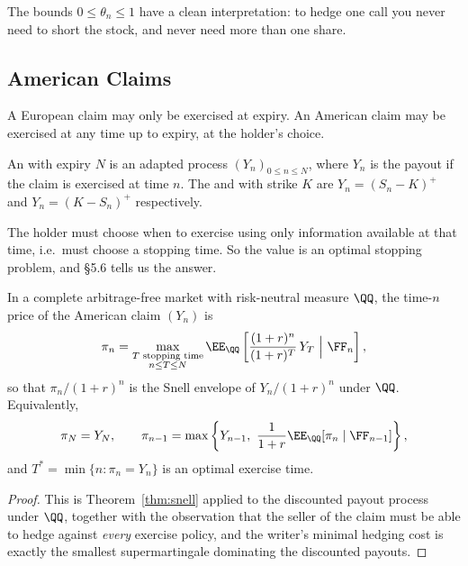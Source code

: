 The bounds $0 \leq \theta_n \leq 1$ have a clean interpretation: to hedge one call you never need to short the stock, and never need more than one share.

\subsection{American Claims}

A European claim may only be exercised at expiry. An American claim may be exercised at any time up to expiry, at the holder's choice.

\begin{definition}
	An  with expiry $N$ is an adapted process $(Y_n)_{0\leq n\leq N}$, where $Y_n$ is the payout if the claim is exercised at time $n$. The  and  with strike $K$ are $Y_n = (S_n-K)^+$ and $Y_n = (K - S_n)^+$ respectively.
\end{definition}

The holder must choose when to exercise using only information available at that time, i.e.\ must choose a stopping time. So the value is an optimal stopping problem, and \S5.6 tells us the answer.

\begin{theorem}\label{thm:american-price}
	In a complete arbitrage-free market with risk-neutral measure $\QQ$, the time-$n$ price of the American claim $(Y_n)$ is
	$$
	\pi_n = \max_{\substack{T \text{ stopping time}\\ n \leq T \leq N}} \EE_\QQ\left[\frac{(1+r)^n}{(1+r)^{T}}\,Y_T\ \Big|\ \FF_n\right],
	$$
	so that $\pi_n/(1+r)^n$ is the Snell envelope of $Y_n/(1+r)^n$ under $\QQ$. Equivalently,
	$$
	\pi_N = Y_N, \qquad \pi_{n-1} = \max\left\{Y_{n-1},\ \frac{1}{1+r}\EE_\QQ[\pi_n\mid\FF_{n-1}]\right\},
	$$
	and $T^* = \min\{n : \pi_n = Y_n\}$ is an optimal exercise time.
\end{theorem}

\begin{proof}
	This is Theorem~\ref{thm:snell} applied to the discounted payout process under $\QQ$, together with the observation that the seller of the claim must be able to hedge against \emph{every} exercise policy, and the writer's minimal hedging cost is exactly the smallest supermartingale dominating the discounted payouts.
\end{proof}

